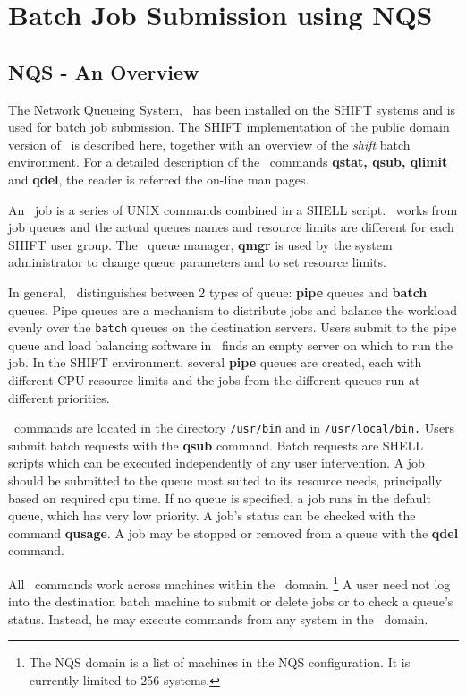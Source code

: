  
 
 
\chapter{Batch Job Submission using NQS}
 
\section{NQS - An Overview}
 
The Network Queueing System, \NQS\,
has been installed on the SHIFT systems and is used for batch job submission.
The SHIFT implementation of the public domain version of \NQS\ is
described here, together with an overview of the {\it shift}
batch environment.  For a detailed description of the \NQS\ commands
{\bf qstat, qsub, qlimit} and {\bf qdel}, the reader is referred
the on-line man pages.
 
An \NQS\ job is a series of UNIX commands combined in a SHELL script.
\NQS\ works from job queues and the actual queues names and resource limits
are different for each SHIFT user group.
The \NQS\ queue manager, {\bf qmgr} is used by the system
administrator to change queue parameters and to set resource limits.
 
In general, \NQS\ distinguishes between 2 types of queue:
{\bf pipe} queues and {\bf batch} queues.
Pipe queues are a mechanism to distribute jobs and balance the
workload evenly over the {\tt batch} queues on the destination servers.
Users submit to the pipe queue and load balancing software
in \NQS\ finds an empty server on which to run the job.
In the SHIFT environment, several {\bf pipe} queues are created,
each with different CPU resource limits and the jobs from the different
queues run at different priorities.
 
\NQS\ commands are located in the directory {\tt/usr/bin} and
in {\tt /usr/local/bin.}
Users submit batch requests with the {\bf qsub}
command.  Batch requests are SHELL scripts which can be executed independently
of any user intervention.  A job should be submitted to the queue most
suited to its resource needs, principally based on required cpu time.
If no queue is specified, a job runs in the default queue,
which has very low priority.
A job's status can be checked with the command {\bf qusage}.
A job may be stopped or removed from a queue with the {\bf qdel} command.
 
All \NQS\ commands work across machines within the
\NQS\ domain.
\footnote {The NQS domain is a list of machines in the NQS configuration.
It is currently limited to 256 systems.}
A user need not log into the destination batch machine to
submit or delete jobs or to check a queue's status.
Instead, he may execute commands from any system in the \NQS\ domain.
 
